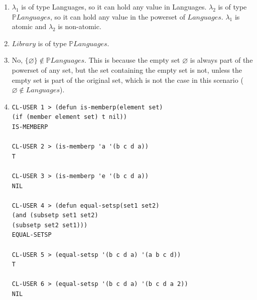 \documentclass[12pt]{article}
\begin{document}
\begin{enumerate}
\item $\lambda_{1}$ is of type Languages, so it can hold any value in Languages. $\lambda_{2}$ is of type $\mathbb{P}Languages$, so it can hold any value in the powerset of $Languages$. $\lambda_{1}$ is atomic and $\lambda_{2}$ is non-atomic.
\item $Library$ is of type $\mathbb{P}Languages$.
\item No, $\{\varnothing \} \notin 
\mathbb{P}Languages$. This is because the empty set $\varnothing$ is always part of the powerset of any set, but the set containing the empty set is not, unless the empty set is part of the original set, which is not the case in this scenario ($\varnothing \notin Languages$).
\item
\begin{verbatim}
CL-USER 1 > (defun is-memberp(element set)
(if (member element set) t nil))
IS-MEMBERP

CL-USER 2 > (is-memberp 'a '(b c d a))
T

CL-USER 3 > (is-memberp 'e '(b c d a))
NIL

CL-USER 4 > (defun equal-setsp(set1 set2)
(and (subsetp set1 set2)
(subsetp set2 set1)))
EQUAL-SETSP

CL-USER 5 > (equal-setsp '(b c d a) '(a b c d))
T

CL-USER 6 > (equal-setsp '(b c d a) '(b c d a 2))
NIL
\end{verbatim}
\end{enumerate}
\end{document}
